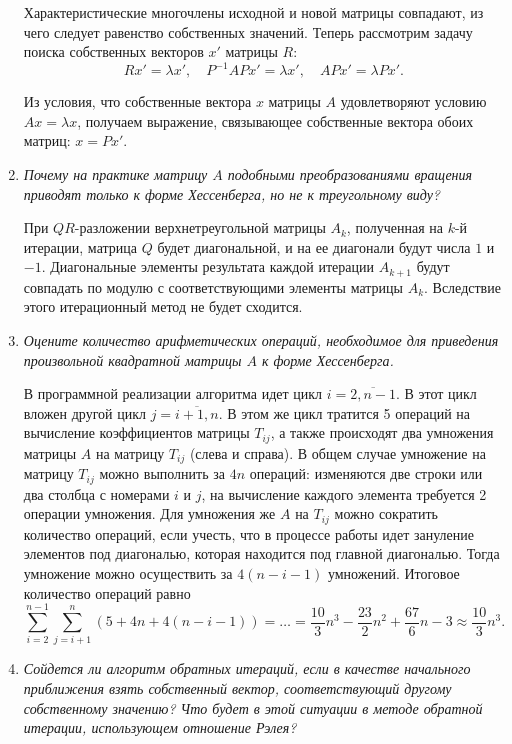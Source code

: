 \documentclass[12pt, a4paper]{article}
\begin{document}
\begin{enumerate}
		Характеристические многочлены исходной и новой матрицы совпадают, из чего следует равенство собственных значений. Теперь рассмотрим задачу поиска собственных векторов $x'$ матрицы $R$:
		\[
		R x' = \lambda x', \quad P^{-1} A P x' = \lambda x', \quad A P x' = \lambda P x'.
		\]
		
		Из условия, что собственные вектора $x$ матрицы $A$ удовлетворяют условию $A x = \lambda x$, получаем выражение, связывающее собственные вектора обоих матриц: $x = P x'$.
		
		\smallskip
		
		\item \textit{Почему на практике матрицу $A$ подобными преобразованиями вращения приводят только к форме Хессенберга, но не к треугольному виду?}
		
		При $QR$-разложении верхнетреугольной матрицы $A_k$, полученная на $k$-й итерации, матрица $Q$ будет диагональной, и на ее диагонали будут числа $1$ и $-1$. Диагональные элементы результата каждой итерации $A_{k+1}$ будут совпадать по модулю с соответствующими элементы матрицы $A_k$. Вследствие этого итерационный метод не будет сходится.
		\smallskip
		
		\item \textit{Оцените количество арифметических операций, необходимое для приведения произвольной квадратной матрицы $A$ к форме Хессенберга.}
		
		В программной реализации алгоритма идет цикл $i = \overline{2, n-1}$. В этот цикл вложен другой цикл $j=\overline{i+1, n}$. В этом же цикл тратится 5 операций на вычисление коэффициентов матрицы $T_{ij}$, а также происходят два умножения матрицы $A$ на матрицу $T_{ij}$ (слева и справа). В общем случае умножение на матрицу $T_{ij}$ можно выполнить за $4 n$ операций: изменяются две строки или два столбца с номерами $i$ и $j$, на вычисление каждого элемента требуется 2 операции умножения. Для умножения же $A$ на $T_{ij}$ можно сократить количество операций, если учесть, что в процессе работы идет зануление элементов под диагональю, которая находится под главной диагональю. Тогда умножение можно осуществить за $4(n-i-1)$ умножений. Итоговое количество операций равно
		\[
		\sum_{i=2}^{n-1} \sum_{j=i+1}^n (5 + 4n + 4(n-i-1)) = \dots = \frac{10}{3} n^3 - \frac{23}{2} n^2 + \frac{67}{6}n - 3 \approx \frac{10}{3} n^3.
		\]
		
		\smallskip
		
		\item \textit{Сойдется ли алгоритм обратных итераций, если в качестве начального приближения взять собственный вектор, соответствующий другому собственному значению? Что будет в этой ситуации в методе обратной итерации, использующем отношение Рэлея?}
		

\end{enumerate}
\end{document}
